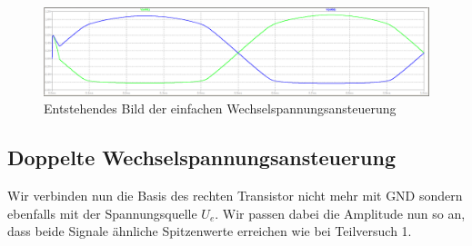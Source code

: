 \documentclass{article}
\begin{document}
\begin{figure}[h]
  \centering
  \includegraphics[scale=0.3]{../assets/images/EL2P1/DeepinScreenshot_select-area_20210417231348.png}
  \caption{Entstehendes Bild der einfachen Wechselspannungsansteuerung}
  \label{fig:diag2}
\end{figure}

\subsection{Doppelte Wechselspannungsansteuerung}

Wir verbinden nun die Basis des rechten Transistor nicht mehr mit GND sondern ebenfalls mit der Spannungsquelle
$U_e$. Wir passen dabei die Amplitude nun so an, dass beide Signale ähnliche Spitzenwerte erreichen wie bei Teilversuch 1.
\end{document}
